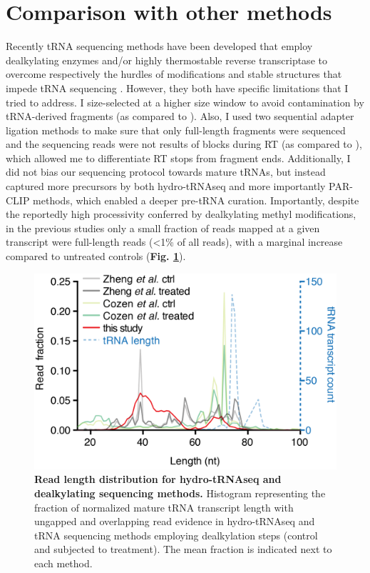 \documentclass[12pt]{rockefeller}
\begin{document}
\section{Comparison with other methods}

Recently tRNA sequencing methods have been developed that employ dealkylating enzymes and/or highly thermostable reverse transcriptase to overcome respectively the hurdles of modifications and stable structures that impede tRNA sequencing \cite{Cozen:2015ds, Zheng:2015dw}. However, they both have specific limitations that I tried to address. I size-selected at a higher size window to avoid contamination by tRNA-derived fragments (as compared to \cite{Cozen:2015ds}). Also, I used two sequential adapter ligation methods to make sure that only full-length fragments were sequenced and the sequencing reads were not results of blocks during RT (as compared to \cite{Zheng:2015dw}), which allowed me to differentiate RT stops from fragment ends. Additionally, I did not bias our sequencing protocol towards mature tRNAs, but instead captured more precursors by both hydro-tRNAseq and more importantly PAR-CLIP methods, which enabled a deeper pre-tRNA curation. Importantly, despite the reportedly high processivity conferred by dealkylating methyl modifications, in the previous studies only a small fraction of reads mapped at a given transcript were full-length reads (<1\% of all reads), with a marginal increase compared to untreated controls (\textbf{Fig. \ref{supp6}}). 

\begin{figure}[!ht]%
\centering
\includegraphics{supp6.png}%
\caption[Read length distribution for hydro-tRNAseq and dealkylating sequencing methods.]
{\textbf{Read length distribution for hydro-tRNAseq and dealkylating sequencing methods.}
Histogram representing the fraction of normalized mature tRNA transcript length with ungapped and overlapping read evidence in hydro-tRNAseq and tRNA sequencing methods employing dealkylation steps (control and subjected to treatment). The mean fraction is indicated next to each method.}
\centering
\label{supp6}%
\end{figure}
\end{document}
